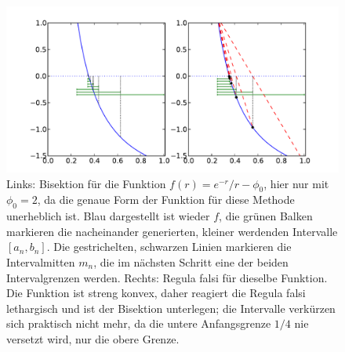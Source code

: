 \begin{figure}
  \centering
  \includegraphics[width=\textwidth]{plots/bisektion}
  \caption{Links: Bisektion für die Funktion $f(r) = e^{-r}/r -
    \phi_0$, hier nur mit $\phi_0=2$, da die genaue Form der Funktion
    für diese Methode unerheblich ist. Blau dargestellt ist wieder
    $f$, die grünen Balken markieren die nacheinander generierten,
    kleiner werdenden Intervalle $[a_n, b_n]$. Die gestrichelten,
    schwarzen Linien markieren die Intervalmitten $m_n$, die im
    nächsten Schritt eine der beiden Intervalgrenzen werden. Rechts:
    Regula falsi für dieselbe Funktion. Die Funktion ist streng
    konvex, daher reagiert die Regula falsi lethargisch und ist der
    Bisektion unterlegen; die Intervalle verkürzen sich praktisch
    nicht mehr, da die untere Anfangsgrenze $1/4$ nie versetzt wird,
    nur die obere Grenze.}
  \label{fig:bisektion}
\end{figure}

\section{}


